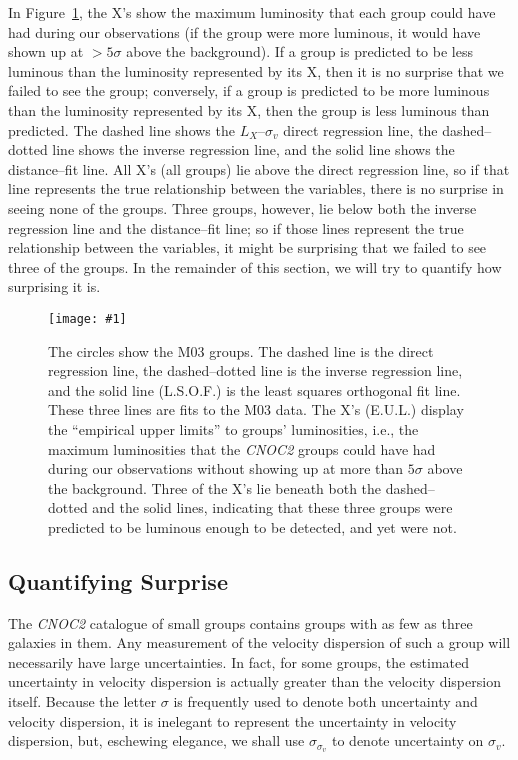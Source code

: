 \documentclass[12pt,preprint]{aastex}
\def\plotone#1{\centering \leavevmode
\texttt{[image: \#1]}}
\begin{document}
In Figure~\ref{fig:maxlums}, the X's show the maximum luminosity that
each group could have had during our observations
(if the group were more luminous, it would have
shown up at $>5\sigma$ above the background).
If a group is predicted to be less luminous than the luminosity represented by
its X, then it is no surprise that we failed to see the group; conversely, if
a group is predicted to be more luminous than the luminosity represented by
its X, then the group is less luminous than predicted.
The dashed line shows the $L_X$--$\sigma_v$
direct regression line, the dashed--dotted line shows the inverse regression
line, and the solid line shows the distance--fit line.
All X's (all groups) lie above the direct regression line, so if that line
represents the true relationship between the variables, there is no surprise in
seeing none of the groups.  Three groups, however, lie below both the inverse
regression line and the distance--fit line; so if those lines represent the true
relationship between the variables, it might be surprising that we failed to 
see three of the groups.  In the remainder of this section, we will try to
quantify how surprising it is.
\begin{figure}[thb]
\plotone{figs/luminosities22.eps}
\caption{The circles show the M03 groups.
The dashed line is the direct regression line, the dashed--dotted line is 
the inverse regression line, and the solid line (L.S.O.F.) is the 
least squares orthogonal fit line.
These three lines are fits to the M03 data.
The X's (E.U.L.) display the ``empirical upper limits'' to groups' luminosities,
i.e., the maximum luminosities that the \textsl{CNOC2} groups could
have had during our observations without showing up at more than $5\sigma$
above the background.
Three of the X's lie beneath both the dashed--dotted and the solid lines,
indicating that these three groups were predicted to be luminous enough to be
detected, and yet were not.
}
\label{fig:maxlums}
\end{figure}

\subsection{Quantifying Surprise}
\label{subsec:surprise}
The \textsl{CNOC2} catalogue of small groups \citep{carlberg2001gg}
contains groups with as few as three galaxies in them.  Any measurement of the
velocity dispersion of such a group will necessarily have large
uncertainties.  In fact, for some groups, the estimated uncertainty in velocity
dispersion is actually greater than the velocity dispersion itself.  Because
the letter $\sigma$ is frequently used to denote both uncertainty and velocity
dispersion, it is inelegant to represent the uncertainty in velocity
dispersion, but, eschewing elegance, we shall use $\sigma_{\sigma_v}$ to
denote uncertainty on $\sigma_v$.
\end{document}
